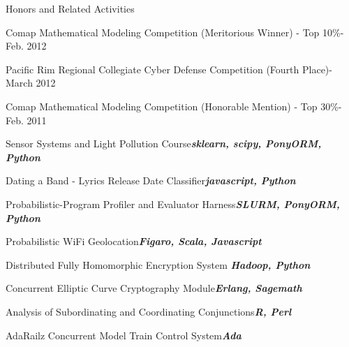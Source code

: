 \documentclass{article}
\newenvironment{**mylist}[2]{
  \subsubsection*{#1\hfill\small#2}
  \small
  \begin{list}{}{}
   \setlength{\topsep}{0pt}
   \setlength{\itemsep}{1pt}
   \setlength{\parskip}{0pt}
   \setlength{\parsep}{0pt}}{\end{list}\normalsize}
\newcommand{\LUx}[1]{{\bf\em #1}}
\begin{document}
\begin{**mylist}{Honors and Related Activities}{}
\item Comap Mathematical Modeling Competition (Meritorious Winner) - Top 10\%\hfill- Feb. 2012
\item Pacific Rim Regional Collegiate Cyber Defense Competition  (Fourth Place)\hfill- March 2012
\item Comap Mathematical Modeling Competition (Honorable Mention) { }- Top 30\%\hfill- Feb. 2011
\end{**mylist}


\small
\vspace{-.08in}\begin{**mylist}{}{}
\item Sensor Systems and Light Pollution Course\hfill\LUx{sklearn, scipy, PonyORM, Python}
\item Dating a Band - Lyrics Release Date Classifier\hfill\LUx{javascript, Python}
\item Probabilistic-Program Profiler and Evaluator Harness\hfill\LUx{SLURM, PonyORM, Python}
\item Probabilistic WiFi Geolocation\hfill\LUx{Figaro, Scala, Javascript}
\item Distributed Fully Homomorphic Encryption System \hfill\LUx{Hadoop, Python}
\item Concurrent Elliptic Curve Cryptography Module\hfill\LUx{Erlang, Sagemath}
\item Analysis of Subordinating and Coordinating Conjunctions\hfill\LUx{R, Perl}
\item AdaRailz Concurrent Model Train Control System\hfill\LUx{Ada}
\end{**mylist}
\end{document}
